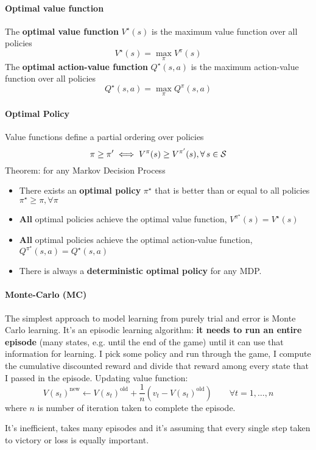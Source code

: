\paragraph{Optimal value function} The \textbf{optimal value function} $V^{\star}(s) $ is the maximum value function over all policies
\[
    V^{\star}(s) = \max_{\pi}V^{\pi}(s)
\]
The \textbf{optimal action-value function} $Q^{\star}(s,a) $ is the maximum action-value function over all policies
\[
    Q^{\star}(s,a) = \max_{\pi}Q^{\pi}(s,a)
\]

\paragraph{Optimal Policy} Value functions define a partial ordering over policies
\[
    \pi \geq \pi ' \iff V^{\pi}(s)\geq V^{\pi'}(s), \forall s\in \Sc
\]
Theorem: for any Markov Decision Process
\begin{itemize}
    \item There exists an \textbf{optimal policy} $\pi^{\star} $ that is better than or equal to all policies $\pi^{\star}\geq \pi,\forall \pi  $
    \item \textbf{All} optimal policies achieve the optimal value function, $V^{\pi^{\star}}(s) = V^{\star}(s)$
    \item \textbf{All} optimal policies achieve the optimal action-value function, $Q^{\pi^{\star}}(s,a) = Q^{\star}(s,a)$
    \item There is always a \textbf{deterministic optimal policy} for any MDP.
\end{itemize}

\paragraph{Monte-Carlo (MC)}
The simplest approach to model learning from purely trial and error is Monte Carlo learning. It's an episodic learning algorithm: \textbf{it needs to run an entire episode} (many states, e.g. until the end of the game) until it can use that information for learning.
I pick some policy and run through the game, I compute the cumulative discounted reward and divide that reward among every state that I passed in the episode. Updating value function:
\[
    \boxed{V(s_t)^{\text{new}}\leftarrow V(s_t)^{\text{old}} + \frac{1}{n} \left( v_t - V(s_t)^{\text{old}} \right) \qquad \forall t=1,\ldots,n}
\]
where $n$ is number of iteration taken to complete the episode.

It's inefficient, takes many episodes and it's assuming that every single step taken to victory or loss is equally important.

